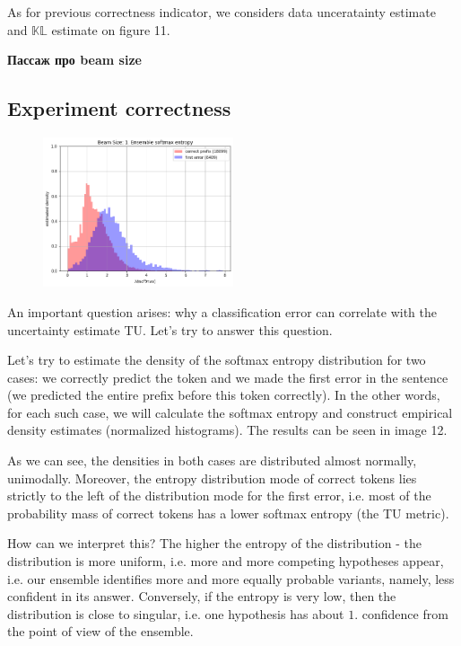 \documentclass[a4paper,14pt]{extarticle}
\begin{document}
	As for previous correctness indicator, we considers data unceratainty estimate and $\mathbb{KL}$ estimate on figure 11.
	
	\textbf{Пассаж про beam size}


	
\subsection{Experiment correctness}
	\begin{figure}
		\includegraphics[width=0.5\textwidth]{images/ens_entropy.png}
	\end{figure}
	
	An important question arises: why a classification error can correlate with the uncertainty estimate TU. Let's try to answer this question.
	
	Let's try to estimate the density of the softmax entropy distribution for two cases: we correctly predict the token and we made the first error in the sentence (we predicted the entire prefix before this token correctly). In the other words, for each such case, we will calculate the softmax entropy and construct empirical density estimates (normalized histograms). The results can be seen in image 12.

	As we can see, the densities in both cases are distributed almost normally, unimodally. Moreover, the entropy distribution mode of correct tokens lies strictly to the left of the distribution mode for the first error, i.e. most of the probability mass of correct tokens has a lower softmax entropy (the TU metric).

	How can we interpret this? The higher the entropy of the distribution - the distribution is more uniform, i.e. more and more competing hypotheses appear, i.e. our ensemble identifies more and more equally probable variants, namely, less confident in its answer. Conversely, if the entropy is very low, then the distribution is close to singular, i.e. one hypothesis has about $1.$ confidence from the point of view of the ensemble.
\end{document}
